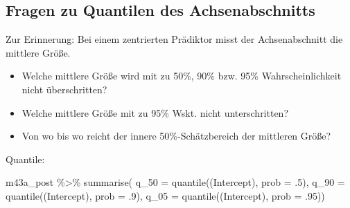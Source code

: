 \documentclass[
  a4paper,
  DIV=11]{scrreprt}
\newenvironment{Shaded}{\begin{snugshade}}{\end{snugshade}}
\newcommand{\AttributeTok}[1]{\textcolor[rgb]{0.40,0.45,0.13}{#1}}
\newcommand{\DecValTok}[1]{\textcolor[rgb]{0.68,0.00,0.00}{#1}}
\newcommand{\FunctionTok}[1]{\textcolor[rgb]{0.28,0.35,0.67}{#1}}
\newcommand{\NormalTok}[1]{\textcolor[rgb]{0.00,0.23,0.31}{#1}}
\newcommand{\SpecialCharTok}[1]{\textcolor[rgb]{0.37,0.37,0.37}{#1}}
\newcommand{\StringTok}[1]{\textcolor[rgb]{0.13,0.47,0.30}{#1}}
\providecommand{\tightlist}{%
  \setlength{\itemsep}{0pt}\setlength{\parskip}{0pt}}\usepackage{longtable,booktabs,array}
\theoremstyle{definition}
\theoremstyle{remark}
\begin{document}
\hypertarget{fragen-zu-quantilen-des-achsenabschnitts}{%
\subsection{Fragen zu Quantilen des
Achsenabschnitts}\label{fragen-zu-quantilen-des-achsenabschnitts}}

\begin{tcolorbox}[enhanced jigsaw, leftrule=.75mm, left=2mm, bottomrule=.15mm, opacityback=0, coltitle=black, colbacktitle=quarto-callout-note-color!10!white, opacitybacktitle=0.6, rightrule=.15mm, toptitle=1mm, colback=white, colframe=quarto-callout-note-color-frame, arc=.35mm, toprule=.15mm, breakable, titlerule=0mm, bottomtitle=1mm, title=\textcolor{quarto-callout-note-color}{\faInfo}\hspace{0.5em}{Hinweis}]
Zur Erinnerung: Bei einem zentrierten Prädiktor misst der
Achsenabschnitt die mittlere Größe.
\end{tcolorbox}

\begin{itemize}
\tightlist
\item
  Welche mittlere Größe wird mit zu 50\%, 90\% bzw. 95\%
  Wahrscheinlichkeit nicht überschritten?
\item
  Welche mittlere Größe mit zu 95\% Wskt. nicht unterschritten?
\item
  Von wo bis wo reicht der innere 50\%-Schätzbereich der mittleren
  Größe?
\end{itemize}

Quantile:

\begin{Shaded}
\begin{Highlighting}[]
\NormalTok{m43a\_post }\SpecialCharTok{\%\textgreater{}\%} 
  \FunctionTok{summarise}\NormalTok{(}
    \AttributeTok{q\_50 =} \FunctionTok{quantile}\NormalTok{(}\StringTok{\textasciigrave{}}\AttributeTok{(Intercept)}\StringTok{\textasciigrave{}}\NormalTok{, }\AttributeTok{prob =}\NormalTok{ .}\DecValTok{5}\NormalTok{),}
    \AttributeTok{q\_90 =} \FunctionTok{quantile}\NormalTok{(}\StringTok{\textasciigrave{}}\AttributeTok{(Intercept)}\StringTok{\textasciigrave{}}\NormalTok{, }\AttributeTok{prob =}\NormalTok{ .}\DecValTok{9}\NormalTok{),}
    \AttributeTok{q\_05 =} \FunctionTok{quantile}\NormalTok{(}\StringTok{\textasciigrave{}}\AttributeTok{(Intercept)}\StringTok{\textasciigrave{}}\NormalTok{, }\AttributeTok{prob =}\NormalTok{ .}\DecValTok{95}\NormalTok{))}
\end{Highlighting}
\end{Shaded}
\end{document}
